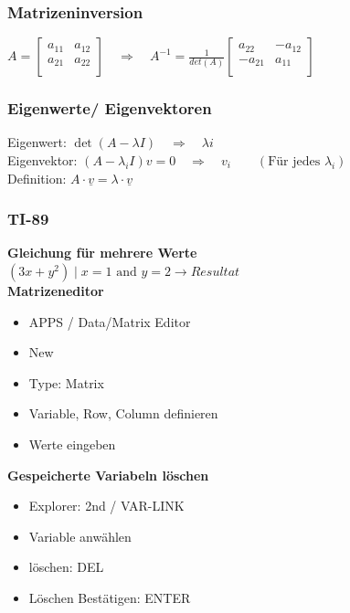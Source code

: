 	
	\begin{minipage}[t]{9.5cm}
		\subsubsection{Matrizeninversion}
			$A=\begin{bmatrix}
						a_{11}&a_{12}\\
						a_{21}&a_{22}\\
				\end{bmatrix}\quad\Rightarrow\quad
			A^{-1}=\frac{1}{det(A)}
			\begin{bmatrix}
				a_{22}&-a_{12}\\
				-a_{21}&a_{11}\\
			\end{bmatrix}$
	\end{minipage}
	\hfill
	\begin{minipage}[t]{9.5cm}
		\subsubsection{Eigenwerte/ Eigenvektoren}
			Eigenwert: $\det(A-\lambda I)\quad\Rightarrow\quad \lambda i$\\
			Eigenvektor: $(A-\lambda_i I)v=0\quad\Rightarrow\quad v_i\qquad(\text{Für jedes }\lambda_i)$\\
			Definition: $ A\cdot \underline{v} = \lambda \cdot \underline{v} $
	\end{minipage}
	
	
	\begin{minipage}[t]{9.5cm}
		\subsubsection{TI-89}
			\textbf{Gleichung für mehrere Werte}\\
			$(3x+y^2) \mid x=1 \text{ and } y=2 \to Resultat$\\
			\textbf{Matrizeneditor}
			\begin{itemize}
			  \item APPS / Data/Matrix Editor
			  \item New
			  \item Type: Matrix
			  \item Variable, Row, Column definieren
			  \item Werte eingeben
			\end{itemize}
			
			\textbf{Gespeicherte Variabeln löschen}
			\begin{itemize}
			\item Explorer: 2nd / VAR-LINK
			\item Variable anwählen
			\item löschen: DEL
			\item Löschen Bestätigen: ENTER
			\end{itemize}
			
	\end{minipage}
	

